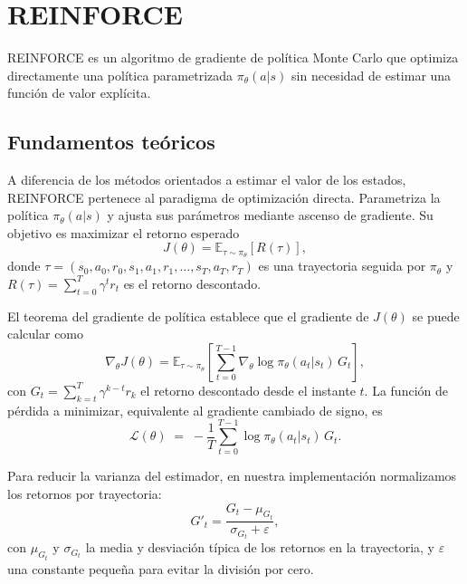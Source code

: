 \documentclass[11pt,a4paper]{article}
\begin{document}
\section{REINFORCE}

REINFORCE es un algoritmo de gradiente de política Monte Carlo que optimiza directamente una política parametrizada $\pi_\theta(a|s)$ sin necesidad de estimar una función de valor explícita.

\subsection{Fundamentos teóricos}

A diferencia de los métodos orientados a estimar el valor de los estados, REINFORCE pertenece al paradigma de optimización directa. Parametriza la política $\pi_\theta(a|s)$ y ajusta sus parámetros mediante ascenso de gradiente. Su objetivo es maximizar el retorno esperado
\begin{equation}
  J(\theta) = \mathbb{E}_{\tau\sim\pi_\theta}\!\left[R(\tau)\right],
  \label{eq:reinforce-obj}
\end{equation}
donde $\tau = (s_0,a_0,r_0,s_1,a_1,r_1,\dots,s_T,a_T,r_T)$ es una trayectoria seguida por $\pi_\theta$ y $R(\tau)=\sum_{t=0}^{T}\gamma^{t}r_t$ es el retorno descontado.

El teorema del gradiente de política establece que el gradiente de $J(\theta)$ se puede calcular como
\begin{equation}
  \nabla_{\theta} J(\theta) = \mathbb{E}_{\tau\sim\pi_\theta}\!\left[\sum_{t=0}^{T-1} \nabla_\theta \log \pi_\theta(a_t|s_t)\, G_t\right],
\end{equation}
con $G_t = \sum_{k=t}^{T} \gamma^{k-t} r_k$ el retorno descontado desde el instante $t$. La función de pérdida a minimizar, equivalente al gradiente cambiado de signo, es
\begin{equation}
  \mathcal{L}(\theta) \;=\; -\frac{1}{T}\sum_{t=0}^{T-1}\log \pi_\theta(a_t|s_t)\, G_t.
\end{equation}

Para reducir la varianza del estimador, en nuestra implementación normalizamos los retornos por trayectoria:
\begin{equation}
  G'_t = \frac{G_t - \mu_{G_t}}{\sigma_{G_t} + \varepsilon},
\end{equation}
con $\mu_{G_t}$ y $\sigma_{G_t}$ la media y desviación típica de los retornos en la trayectoria, y $\varepsilon$ una constante pequeña para evitar la división por cero.
\end{document}

